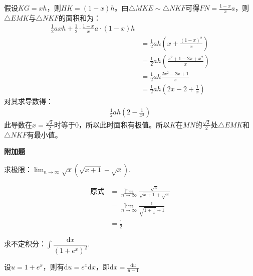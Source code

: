 \documentclass[answers]{exam}
\begin{document}
\begin{questions}
\begin{solution}
		假设$KG=xh$，则$HK=(1-x)h$。由$\triangle{MKE} \sim \triangle{NKF}$可得$FN =
			\frac{1-x}{x}a$，则$\triangle{EMK}$与$\triangle{NKF}$的面积和为：
		\begin{align*}
			\frac12axh + \frac12\cdot\frac{1-x}{x}a\cdot(1-x)h
			\\                              & = \frac12ah(x + \frac{(1-x)^2}{x})
			\\                              & = \frac12ah(\frac{x^2 + 1 - 2x + x^2}{x})
			\\                            & = \frac12ah\frac{2x^2 - 2x + 1}{x}
			\\ & = \frac12ah(2x -2 + \frac1x)
		\end{align*}
		对其求导数得：
		\begin{align*}
			\frac12ah(2 - \frac{1}{x^2})
		\end{align*}
		此导数在$x =
			\frac{\sqrt{2}}{2}$时等于$0$，所以此时面积有极值。所以$K$在$MN$的$\frac{\sqrt{2}}{2}$处$\triangle{EMK}$和$\triangle{NKF}$有最小值。

	\end{solution}

	\begin{center}
		\textbf{附加题}
	\end{center}

	\question 求极限：$ \displaystyle \lim_{n\to\infty}\sqrt{x}(\sqrt{x+1} - \sqrt{x}) $.
	\begin{solution}
		\begin{align*}
			\text{原式} & = \lim_{n\to\infty}\frac{\sqrt{x}}{\sqrt{x+1} + \sqrt{x}} \\
			          & = \lim_{n\to\infty}\frac{1}{\sqrt{1 + \frac1x} + 1}       \\
			          & = \frac12
		\end{align*}
	\end{solution}
	\question 求不定积分：$\int\dfrac{\mathrm{d}x}{(1+e^x)^2}$.
	\begin{solution}
		设$u = 1 + e^x$，则有$\mathrm{d}u = e^x\mathrm{d}x$，即$\mathrm{d}x = \frac{\mathrm{d}u}{u-1}$


\end{solution}
\end{questions}
\end{document}
